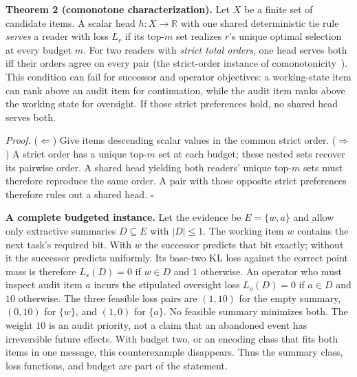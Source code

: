 \documentclass[11pt,a4paper]{article}
\begin{document}


\begin{thebox}
\textbf{Theorem 2 (comonotone characterization).} Let $X$ be a finite set of candidate items. A scalar head $h:X\to\mathbb R$ with one shared deterministic tie rule \emph{serves} a reader with loss $L_r$ if its top-$m$ set realizes $r$'s unique optimal selection at every budget $m$. For two readers with \emph{strict total orders}, one head serves both iff their orders agree on every pair (the strict-order instance of comonotonicity~\cite{schmeidler1989,yaari1987}). This condition can fail for successor and operator objectives: a working-state item can rank above an audit item for continuation, while the audit item ranks above the working state for oversight. If those strict preferences hold, no shared head serves both.

\emph{Proof.} ($\Leftarrow$) Give items descending scalar values in the common strict order. ($\Rightarrow$) A strict order has a unique top-$m$ set at each budget; these nested sets recover its pairwise order. A shared head yielding both readers' unique top-$m$ sets must therefore reproduce the same order. A pair with those opposite strict preferences therefore rules out a shared head. $\square$
\end{thebox}

\textbf{A complete budgeted instance.} Let the evidence be $E=\{w,a\}$ and allow only extractive summaries $D\subseteq E$ with $|D|\le1$. The working item $w$ contains the next task's required bit. With $w$ the successor predicts that bit exactly; without it the successor predicts uniformly. Its base-two KL loss against the correct point mass is therefore $L_s(D)=0$ if $w\in D$ and $1$ otherwise. An operator who must inspect audit item $a$ incurs the stipulated oversight loss $L_o(D)=0$ if $a\in D$ and $10$ otherwise. The three feasible loss pairs are $(1,10)$ for the empty summary, $(0,10)$ for $\{w\}$, and $(1,0)$ for $\{a\}$. No feasible summary minimizes both. The weight $10$ is an audit priority, not a claim that an abandoned event has irreversible future effects. With budget two, or an encoding class that fits both items in one message, this counterexample disappears. Thus the summary class, loss functions, and budget are part of the statement.
\end{document}
